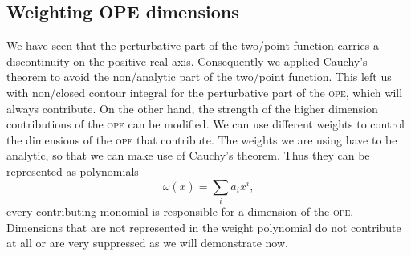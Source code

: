 \documentclass[../../index.tex]{subfiles}
\begin{document}
\subsection{Weighting OPE dimensions}
We have seen that the perturbative part of the two\-/point function carries a
discontinuity on the positive real axis. Consequently we applied Cauchy's
theorem to avoid the non\-/analytic part of the two\-/point function. This left
us with non\-/closed contour integral for the perturbative part of the
\textsc{ope}, which will always contribute. On the other hand, the strength of
the higher dimension contributions of the \textsc{ope} can be modified. We can
use different weights to control the dimensions of the \textsc{ope} that
contribute. The weights we are using have to be analytic, so that we can make
use of Cauchy's theorem. Thus they can be represented as polynomials
\begin{equation}
  \omega(x) = \sum_i a_i x^i,
\end{equation}
every contributing monomial is responsible for a dimension of the \textsc{ope}.
Dimensions that are not represented in the weight polynomial do not contribute
at all or are very suppressed as we will demonstrate now.
\end{document}
